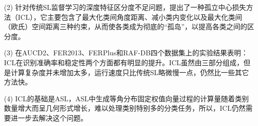 (2)	针对传统SL监督学习的深度特征区分度不足问题，提出了一种孤立中心损失方法（ICL），它主要包含了最大化类间角度距离、减小类内变化以及最大化类间（欧氏）空间距离三种约束，从而使各类成为彻底的“孤岛”，以提高各类之间的区分度。

(3)	在AUCD2、FER2013、FERPlus和RAF-DB四个数据集上的实验结果表明：ICL在识别准确率和稳定性两个方面都有明显的提升。ICL虽然由三部分组成，但是计算复杂度并未增加太多，运行速度只比传统SL略微慢一点，仍然比一些其它方法快。

(4) ICL的基础是ASL，ASL中生成等角分布固定权值向量过程的计算量随着类别数量增大而呈几何形式增长，难以处理类别特别多的分类任务，所以，ICL仍然需要进一步去解决这个问题。








